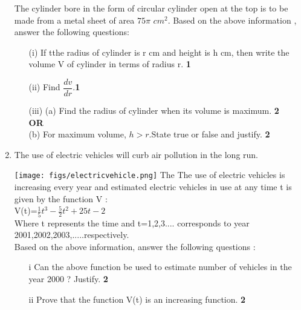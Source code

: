 \documentclass{article}
\begin{document}
\begin{enumerate}
 The cylinder bore in the form of circular cylinder open at the top is to be made from a metal sheet of area ${75\pi}$ ${cm}^2.$
 \vspace{1.0cm}
 Based on the above information , answer the following questions:
 \begin{itemize}
     \item[(i)]  If tthe radius of cylinder is r cm and height is h cm, then write the volume V of cylinder in terms of radius r. \hspace{7.3cm} \textbf{1}
     \item[(ii)] Find $\dfrac{dv}{dr}.$\hspace{10.5cm}\textbf{1}
     \item[(iii)] (a) Find the radius of cylinder when its volume is maximum. \hspace{1.6cm}\textbf{2}\\
     \centering \textbf{OR}\\
     (b) For maximum volume, $h > r$.State true or false and justify. \hspace{1.2cm}\textbf{2}
 \end{itemize}
 \item The use of electric vehicles will curb air pollution in the long run.
 
 \texttt{[image: figs/electricvehicle.png]}
  \hspace{10.5cm}
  \vspace{0.2cm}
 The The use of electric vehicles is increasing every year and estimated electric vehicles in use at any time t is given by the function V :\\
 \vspace{0.4cm}
 \hspace{0.2cm}V(t)=$\frac{1}{5}t^3 - \frac{5}{2}t^2 + 25t-2$ \\
 Where t represents the time and t=1,2,3.... corresponds to year 2001,2002,2003,.....respectively.\\ \vspace{0.3cm}
 Based on the above information, answer the following questions :
 \begin{enumerate}
     \item[i] Can the above function be used to estimate number of vehicles in the year 2000 ? Justify. \hspace{10.3cm} \textbf{2}
     \item[ii] Prove that the function V(t) is an increasing function. \hspace{5.0cm} \textbf{2}
 \end{enumerate}
  \end{enumerate}
  
\end{document}
